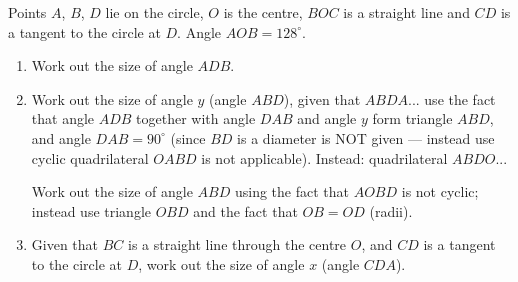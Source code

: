 \begin{question}
\begin{center}
\begin{tikzpicture}[scale=2.1]
\end{tikzpicture}
\end{center}

\noindent Points $A$, $B$, $D$ lie on the circle, $O$ is the centre, $BOC$ is a straight line and $CD$ is a tangent to the circle at $D$. Angle $AOB = 128^\circ$.

\begin{enumerate}
    \item[(a)] Work out the size of angle $ADB$.
    \vspace{3.5cm}

    \item[(b)] Work out the size of angle $y$ (angle $ABD$), given that $ABDA$... use the fact that angle $ADB$ together with angle $DAB$ and angle $y$ form triangle $ABD$, and angle $DAB = 90^\circ$ (since $BD$ is a diameter is NOT given — instead use cyclic quadrilateral $OABD$ is not applicable). Instead: quadrilateral $ABDO$... 
    
    Work out the size of angle $ABD$ using the fact that $AOBD$ is not cyclic; instead use triangle $OBD$ and the fact that $OB = OD$ (radii).
    \vspace{4cm}

    \item[(c)] Given that $BC$ is a straight line through the centre $O$, and $CD$ is a tangent to the circle at $D$, work out the size of angle $x$ (angle $CDA$).
    \vspace{4cm}
\end{enumerate}
\end{question}
